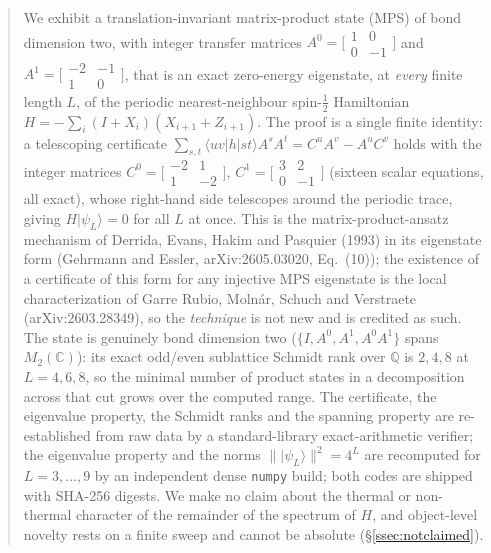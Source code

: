\documentclass[11pt]{amsart}
\newcommand{\ket}[1]{\lvert #1 \rangle}
\newcommand{\bra}[1]{\langle #1 \rvert}
\newcommand{\Mtwo}{M_2(\mathbb{C})}
\newcommand{\psiL}{\ket{\psi_L}}
\theoremstyle{plain}
\theoremstyle{definition}
\theoremstyle{remark}
\begin{document}
\begin{abstract}
We exhibit a translation-invariant matrix-product state (MPS) of bond
dimension two, with integer transfer matrices
$A^0=\bigl[\begin{smallmatrix}1&0\\0&-1\end{smallmatrix}\bigr]$ and
$A^1=\bigl[\begin{smallmatrix}-2&-1\\1&0\end{smallmatrix}\bigr]$, that is
an exact zero-energy eigenstate, at \emph{every} finite length $L$, of the
periodic nearest-neighbour spin-$\tfrac12$ Hamiltonian
$H=-\sum_i (I+X_i)(X_{i+1}+Z_{i+1})$. The proof is a single finite
identity: a telescoping certificate
$\sum_{s,t}\bra{uv}h\ket{st}A^sA^t=C^uA^v-A^uC^v$ holds with the integer
matrices $C^0=\bigl[\begin{smallmatrix}-2&1\\1&-2\end{smallmatrix}\bigr]$,
$C^1=\bigl[\begin{smallmatrix}3&2\\0&-1\end{smallmatrix}\bigr]$ (sixteen
scalar equations, all exact), whose right-hand side telescopes around the
periodic trace, giving $H\psiL=0$ for all $L$ at once. This is the
matrix-product-ansatz mechanism of Derrida, Evans, Hakim and Pasquier
(1993) in its eigenstate form (Gehrmann and Essler, arXiv:2605.03020,
Eq.~(10)); the existence of a certificate of this form for any injective
MPS eigenstate is the local characterization of Garre Rubio, Moln\'ar,
Schuch and Verstraete (arXiv:2603.28349), so the \emph{technique} is not
new and is credited as such. The state is genuinely bond dimension two
($\{I,A^0,A^1,A^0A^1\}$ spans $\Mtwo$): its exact odd/even sublattice Schmidt
rank over $\mathbb{Q}$ is $2,4,8$ at $L=4,6,8$, so the minimal number of
product states in a decomposition across that cut grows over the computed
range. The certificate, the eigenvalue property, the Schmidt ranks and the
spanning property are re-established from raw data by a standard-library
exact-arithmetic verifier; the eigenvalue property and the norms
$\lVert\psiL\rVert^2=4^L$ are recomputed for $L=3,\dots,9$ by an independent dense
\texttt{numpy} build; both codes are shipped with SHA-256 digests. We make no claim about the thermal or
non-thermal character of the remainder of the spectrum of $H$, and object-level
novelty rests on a finite sweep and cannot be absolute
(\S\ref{ssec:notclaimed}).
\end{abstract}
\end{document}
